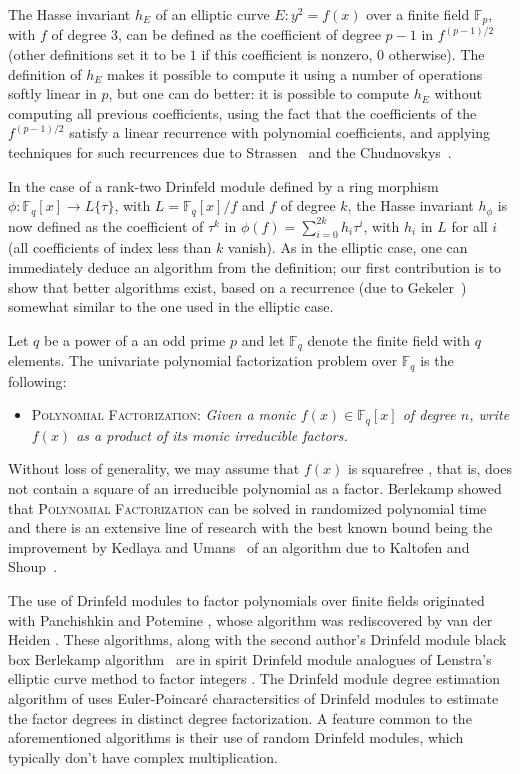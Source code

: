 \documentclass[12pt]{article}
\theoremstyle{plain}
\theoremstyle{definition}
\newcommand{\ang}[1]{\{#1\}}
\def\F{\ensuremath{\mathbb{F}}}
\begin{document}
The Hasse invariant $h_E$ of an elliptic curve $E: y^2=f(x)$ over a
finite field $\F_p$, with $f$ of degree $3$, can be defined as the
coefficient of degree $p-1$ in $f^{(p-1)/2}$ (other definitions set it
to be $1$ if this coefficient is nonzero, $0$ otherwise). The
definition of $h_E$ makes it possible to compute it using a number of
operations softly linear in $p$, but one can do better: it is possible
to compute $h_E$ without computing all previous coefficients, using
the fact that the coefficients of the $f^{(p-1)/2}$ satisfy a linear
recurrence with polynomial coefficients, and applying techniques for
such recurrences due to Strassen~\cite{Strassen76} and the
Chudnovskys~\cite{ChCh88}.

In the case of a rank-two Drinfeld module defined by a ring morphism
$\phi: \F_q[x] \to L\ang{\tau}$, with $L=\F_q[x]/f$ and $f$ of degree
$k$, the Hasse invariant $h_\phi$ is now defined as the coefficient of
$\tau^k$ in $\phi(f) =\sum_{i=0}^{2k} h_i \tau^i$, with $h_i$ in $L$
for all $i$ (all coefficients of index less than $k$ vanish).  As in
the elliptic case, one can immediately deduce an algorithm from the
definition; our first contribution is to show that better algorithms
exist, based on a recurrence (due to Gekeler~\cite{gek}) somewhat 
similar to the one used in the elliptic case.



Let $q$ be a power of a an odd prime $p$ and let $\F_q$ denote the
finite field with $q$ elements.  The univariate polynomial
factorization problem over $\F_q$ is the following:
\begin{itemize}
 \item \textsc{Polynomial Factorization:} \textit{Given a monic $f(x) \in \mathbb{F}_q[x]$ of 
 degree $n$, write $f(x)$ as a product of its monic irreducible factors.}
\end{itemize}


Without loss of generality, we may assume that $f(x)$ is squarefree
\cite{knu,yun}, that is, does not contain a square of an irreducible
polynomial as a factor. Berlekamp showed that \textsc{Polynomial
  Factorization} can be solved in randomized polynomial time
\cite{ber} and there is an extensive line of research
\cite{cz,gs} with the best known bound being the improvement by
Kedlaya and Umans~\cite{ku} of an algorithm due to Kaltofen and
Shoup~\cite{ks}.


The use of Drinfeld modules to factor polynomials over finite fields
originated with Panchishkin and Potemine \cite{pp}, whose algorithm
was rediscovered by van der Heiden \cite{vdH}. These algorithms, along
with the second author's Drinfeld module black box Berlekamp
algorithm~\cite{nar} are in spirit Drinfeld module analogues of
Lenstra's elliptic curve method to factor integers \cite{len}. The
Drinfeld module degree estimation algorithm of \cite{nar} uses
Euler-Poincar\'e charactersitics of Drinfeld modules to estimate the
factor degrees in distinct degree factorization. A feature common to
the aforementioned algorithms is their use of random Drinfeld
modules, which typically don't have complex multiplication. 
\end{document}
